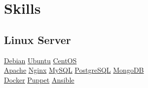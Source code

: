 \documentclass[]{joaosoares-resume}
\begin{document}
\begin{minipage}[t]{0.35\textwidth}



\section{Skills}
\subsection{Linux Server}
\href{http://www.debian.org/}{Debian}\textbullet{}
\href{http://www.ubuntu.com/}{Ubuntu}\textbullet{}
\href{http://www.centos.org/}{CentOS} \\
\href{http://httpd.apache.org/}{Apache}\textbullet{}
\href{https://www.nginx.com/resources/wiki/}{Nginx}\textbullet{}
\href{https://www.mysql.com/}{MySQL} \textbullet{}
\href{http://www.postgresql.org/}{PostgreSQL} \textbullet{}
\href{https://www.mongodb.com/}{MongoDB} \\
\href{http://www.docker.com/}{Docker} \textbullet{}
\href{http://puppetlabs.com/}{Puppet} \textbullet{}
\href{https://www.ansible.com/}{Ansible} \textbullet{}
\sectionsep


\end{minipage}
\end{document}
